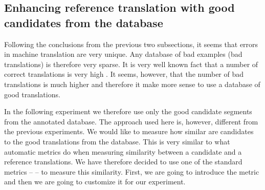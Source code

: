 \subsection{Enhancing reference translation with good candidates from the database}
\label{enhancing:bleu}

Following the conclusions from the previous two subsections, it seems that
errors in machine translation are very unique. Any database of bad examples
(bad translations) is therefore very sparse. It is very well known fact that a
number of correct translations is very high . It
seems, however, that the number of bad translations is much higher and
therefore it make more sense to use a database of good translations. 

In the following experiment we therefore use only the good candidate segments
from the annotated database. The approach used here is, however, different from
the previous experiments. We would like to measure how similar are candidates
to the good translations from the database. This is very similar to what
automatic metrics do when measuring similarity between a candidate and a
reference translations. We have therefore decided to use one of the standard
metrics --  -- to measure this similarity. First, we are going to
introduce the metric and then we are going to customize it for our experiment. 

